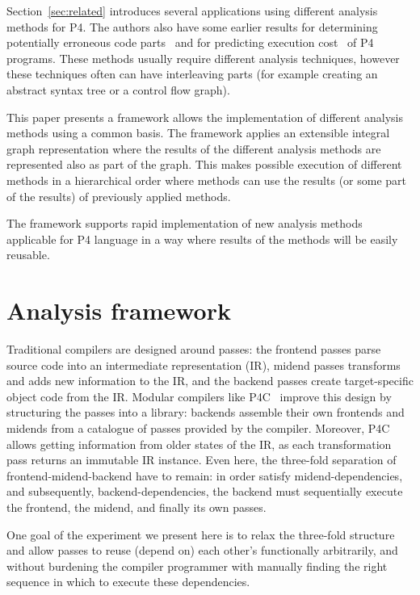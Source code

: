 \documentclass[sigconf]{acmart}
\begin{document}
Section~\ref{sec:related} introduces several applications using different analysis methods for P4. The authors also have some earlier results for determining potentially erroneous code parts~\cite{ownCheck} and for predicting execution cost~\cite{LukacsOcs} of P4 programs. These methods usually require different analysis techniques, however these techniques often can have interleaving parts (for example creating an abstract syntax tree or a control flow graph).

This paper presents a framework allows the implementation of different analysis methods using a common basis. The framework applies an extensible integral graph representation where the results of the different analysis methods are represented also as part of the graph. This makes possible execution of different methods in a hierarchical order where methods can use the results (or some part of the results) of previously applied methods. 

The framework supports rapid implementation of new analysis methods applicable for P4 language in a way where results of the methods will be easily reusable. 

	\section{Analysis framework}


Traditional compilers are designed around passes: the frontend passes parse source code into an intermediate representation (IR), midend passes transforms and adds new information to the IR, and the backend passes create target-specific object code from the IR.  
Modular compilers like P4C~\cite{p4c} improve this design by structuring the passes into a library: backends assemble their own frontends and midends from a catalogue of passes provided by the compiler. Moreover, P4C allows getting information from older states of the IR, as each transformation pass returns an immutable IR instance.
Even here, the three-fold separation of frontend-midend-backend have to remain: in order satisfy midend-dependencies, and subsequently, backend-dependencies, the backend must sequentially execute the frontend, the midend, and finally its own passes. 

One goal of the experiment we present here is to relax the three-fold structure and allow passes to reuse (depend on) each other's functionally arbitrarily, and without burdening the compiler programmer with manually finding the right sequence in which to execute these dependencies.
\end{document}
